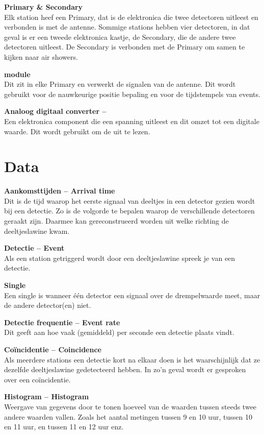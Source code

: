 \textbf{Primary \& Secondary} \\
Elk station heef een Primary, dat is de \hisparc elektronica die twee
detectoren uitleest en verbonden is met de \gps antenne. Sommige
stations hebben vier detectoren, in dat geval is er een tweede \hisparc
elektronica kastje, de Secondary, die de andere twee detectoren uitleest. De
Secondary is verbonden met de Primary om samen te kijken naar air showers.

\textbf{\gps module} \\
Dit zit in elke Primary en verwerkt de signalen van de \gps antenne. Dit
wordt gebruikt voor de nauwkeurige positie bepaling en voor de
tijdstempels van events.

\textbf{Analoog digitaal converter -- \adc} \\
Een elektronica component die een spanning uitleest en dit omzet tot een
digitale waarde. Dit wordt gebruikt om de \pmts uit te lezen.


\section{Data}

\textbf{Aankomsttijden -- Arrival time} \\
Dit is de tijd waarop het eerste signaal van deeltjes in een detector
gezien wordt bij een detectie. Zo is de volgorde te bepalen waarop de
verschillende detectoren geraakt zijn. Daarmee kan gereconstrueerd worden
uit welke richting de deeltjeslawine kwam.

\textbf{Detectie -- Event} \\
Als een station getriggerd wordt door een deeltjeslawine spreek je van
een detectie.

\textbf{Single} \\
Een single is wanneer \'e\'en detector een signaal over de drempelwaarde meet,
maar de andere detector(en) niet.

\textbf{Detectie frequentie -- Event rate} \\
Dit geeft aan hoe vaak (gemiddeld) per seconde een detectie plaats vindt.

\textbf{Coïncidentie -- Coincidence} \\
Als meerdere stations een detectie kort na elkaar doen is het
waarschijnlijk dat ze dezelfde deeltjeslawine gedetecteerd hebben. In
zo'n geval wordt er gesproken over een coïncidentie.

\textbf{Histogram -- Histogram} \\
Weergave van gegevens door te tonen hoeveel van de waarden tussen steeds
twee andere waarden vallen. Zoals het aantal metingen tussen 9 en 10
uur, tussen 10 en 11 uur, en tussen 11 en 12 uur enz.

